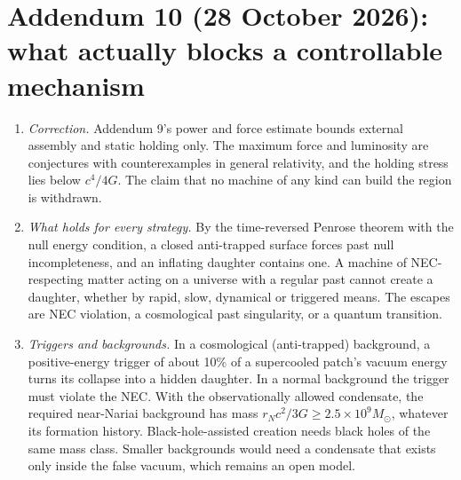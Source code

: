 \documentclass[11pt,a4paper]{article}
\theoremstyle{remark}\newtheorem{remark}[theorem]{Remark}
\begin{document}
\section*{Addendum 10 (28 October 2026): what actually blocks a controllable mechanism}
\begin{enumerate}
\item \emph{Correction.} Addendum 9's power and force estimate bounds external assembly and static holding only. The maximum force and luminosity
are conjectures with counterexamples in general relativity, and the holding stress lies below $c^4/4G$. The claim that no machine of any kind can
build the region is withdrawn.
\item \emph{What holds for every strategy.} By the time-reversed Penrose theorem with the null energy condition, a closed anti-trapped surface forces
past null incompleteness, and an inflating daughter contains one. A machine of NEC-respecting matter acting on a universe with a regular past cannot
create a daughter, whether by rapid, slow, dynamical or triggered means. The escapes are NEC violation, a cosmological past singularity, or a quantum
transition.
\item \emph{Triggers and backgrounds.} In a cosmological (anti-trapped) background, a positive-energy trigger of about 10\% of a supercooled patch's vacuum
energy turns its collapse into a hidden daughter. In a normal background the trigger must violate the NEC. With the observationally allowed condensate,
the required near-Nariai background has mass $r_Nc^2/3G\ge2.5\times10^9M_\odot$, whatever its formation history. Black-hole-assisted creation needs black
holes of the same mass class. Smaller backgrounds would need a condensate that exists only inside the false vacuum, which remains an open model.
\end{enumerate}
\end{document}
